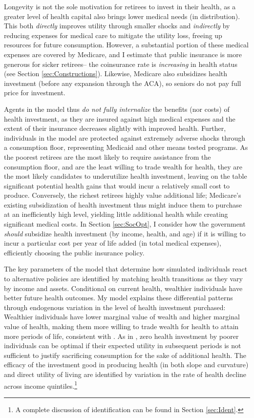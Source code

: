 \documentclass[12pt,pdftex,letterpaper]{article}
\begin{document}
Longevity is not the sole motivation for retirees to invest in their health, as a greater level of health capital also brings lower medical needs (in distribution).  This both \textit{directly} improves utility through smaller shocks and \textit{indirectly} by reducing expenses for medical care to mitigate the utility loss, freeing up resources for future consumption.  However, a substantial portion of these medical expenses are covered by Medicare, and I estimate that public insurance is more generous for sicker retirees-- the coinsurance rate is \textit{increasing} in health status (see Section \ref{sec:Constructions}).  Likewise, Medicare also subsidizes health investment (before any expansion through the ACA), so seniors do not pay full price for investment.

Agents in the model thus \textit{do not fully internalize} the benefits (nor costs) of health investment, as they are insured against high medical expenses and the extent of their insurance decreases slightly with improved health.  Further, individuals in the model are protected against extremely adverse shocks through a consumption floor, representing Medicaid and other means tested programs.  As the poorest retirees are the most likely to require assistance from the consumption floor, and are the least willing to trade wealth for health, they are the most likely candidates to underutilize health investment, leaving on the table significant potential health gains that would incur a relatively small cost to produce.  Conversely, the richest retirees highly value additional life; Medicare's existing subsidization of health investment thus might induce them to purchase at an inefficiently high level, yielding little additional health while creating significant medical costs.  In Section \ref{sec:SocOpt}, I consider how the government \textit{should} subsidize health investment (by income, health, and age) if it is willing to incur a particular cost per year of life added (in total medical expenses), efficiently choosing the public insurance policy.

The key parameters of the model that determine how simulated individuals react to alternative policies are identified by matching health transitions as they vary by income and assets. Conditional on current health, wealthier individuals have better future health outcomes.  My model explains these differential patterns through endogenous variation in the level of health investment purchased: Wealthier individuals have lower marginal value of wealth and higher marginal value of health, making them more willing to trade wealth for health to attain more periods of life, consistent with \cite{hall07}.  As in \cite{arcidiacono07}, zero health investment by poorer individuals can be optimal if their expected utility in subsequent periods is not sufficient to justify sacrificing consumption for the sake of additional health.  The efficacy of the investment good in producing health (in both slope and curvature) and direct utility of living are identified by variation in the rate of health decline across income quintiles.\footnote{A complete discussion of identification can be found in Section \ref{sec:Ident}.}
\end{document}

